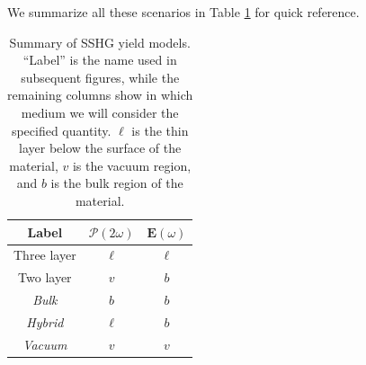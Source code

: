 We summarize all these scenarios in Table \ref{tab:models} for quick reference.

\begin{table}[t]
\begin{tabular}{| c c c |}
\hline 
Label        &  $\boldsymbol{\mathcal{P}}(2\omega)$  &  $\mathbf{E}(\omega)$ \\
\hline 
Three layer     &          $\ell$           &      $\ell$   \\
Two layer       &            $v$            &        $b$    \\
\emph{Bulk}     &            $b$            &        $b$    \\
\emph{Hybrid}   &          $\ell$           &        $b$    \\
\emph{Vacuum}   &            $v$            &        $v$    \\
\hline 
\end{tabular}
\caption{Summary of SSHG yield models. ``Label'' is the name used in subsequent figures, while the remaining columns show in which medium we will consider the specified quantity. $\ell$ is the thin layer below the surface of the material, $v$ is the vacuum region, and $b$ is the bulk region of the material.}
\label{tab:models}
\end{table}

